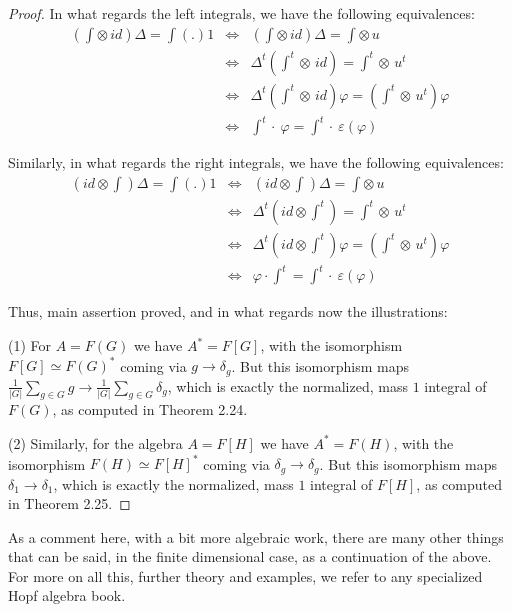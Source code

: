 \documentclass[12pt]{amsbook}
\begin{document}
\begin{proof}
In what regards the left integrals, we have the following equivalences:
\begin{eqnarray*}
\left(\int\otimes\,id\right)\Delta=\int(.)1
&\iff&\left(\int\otimes\,id\right)\Delta=\int\otimes\,u\\
&\iff&\Delta^t\left(\int^t\otimes\,id\right)=\int^t\otimes\,u^t\\
&\iff&\Delta^t\left(\int^t\otimes\,id\right)\varphi=\left(\int^t\otimes\,u^t\right)\varphi\\
&\iff&\int^t\cdot\ \varphi=\int^t\cdot\ \varepsilon(\varphi)
\end{eqnarray*}

Similarly, in what regards the right integrals, we have the following equivalences:
\begin{eqnarray*}
\left(id\otimes\int\right)\Delta=\int(.)1
&\iff&\left(id\otimes\int\right)\Delta=\int\otimes\,u\\
&\iff&\Delta^t\left(id\otimes\int^t\right)=\int^t\otimes\,u^t\\
&\iff&\Delta^t\left(id\otimes\int^t\right)\varphi=\left(\int^t\otimes\,u^t\right)\varphi\\
&\iff&\varphi\cdot\int^t=\int^t\cdot\ \varepsilon(\varphi)
\end{eqnarray*}

Thus, main assertion proved, and in what regards now the illustrations:

\medskip

(1) For $A=F(G)$ we have $A^*=F[G]$, with the isomorphism $F[G]\simeq F(G)^*$ coming via $g\to\delta_g$. But this isomorphism maps $\frac{1}{|G|}\sum_{g\in G}g\to\frac{1}{|G|}\sum_{g\in G}\delta_g$, which is exactly the normalized, mass $1$ integral of $F(G)$, as computed in Theorem 2.24.

\medskip

(2) Similarly, for the algebra $A=F[H]$ we have $A^*=F(H)$, with the isomorphism $F(H)\simeq F[H]^*$ coming via $\delta_g\to\delta_g$. But this isomorphism maps $\delta_1\to\delta_1$, which is exactly the normalized, mass $1$ integral of $F[H]$, as computed in Theorem 2.25.
\end{proof}

As a comment here, with a bit more algebraic work, there are many other things that can be said, in the finite dimensional case, as a continuation of the above. For more on all this, further theory and examples, we refer to any specialized Hopf algebra book.
\end{document}
